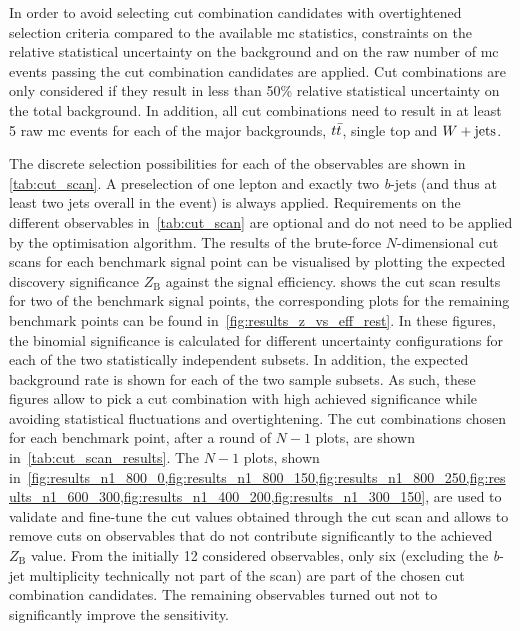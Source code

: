 In order to avoid selecting cut combination candidates with overtightened selection criteria compared to the available \gls{mc} statistics, constraints on the relative statistical uncertainty on the background and on the raw number of \gls{mc} events passing the cut combination candidates are applied. Cut combinations are only considered if they result in less than 50\% relative statistical uncertainty on the total background. In addition, all cut combinations need to result in at least 5 raw \gls{mc} events for each of the major backgrounds, $t\bar{t}$, single top and $W+\mathrm{jets}$.

The discrete selection possibilities for each of the observables are shown in \cref{tab:cut_scan}. A preselection of one lepton and exactly two \textit{b}-jets (and thus at least two jets overall in the event) is always applied. Requirements on the different observables in~\cref{tab:cut_scan} are optional and do not need to be applied by the optimisation algorithm. The results of the brute-force $N$-dimensional cut scans for each benchmark signal point can be visualised by plotting the expected discovery significance $Z_\mathrm{B}$ against the signal efficiency.  shows the cut scan results for two of the benchmark signal points, the corresponding plots for the remaining benchmark points can be found in~\cref{fig:results_z_vs_eff_rest}. In these figures, the binomial significance is calculated for different uncertainty configurations for each of the two statistically independent subsets. In addition, the expected background rate is shown for each of the two sample subsets. As such, these figures allow to pick a cut combination with high achieved significance while avoiding statistical fluctuations and overtightening. The cut combinations chosen for each benchmark point, after a round of $N-1$ plots, are shown in~\cref{tab:cut_scan_results}. The $N-1$ plots, shown in~\cref{fig:results_n1_800_0,fig:results_n1_800_150,fig:results_n1_800_250,fig:results_n1_600_300,fig:results_n1_400_200,fig:results_n1_300_150}, are used to validate and fine-tune the cut values obtained through the cut scan and allows to remove cuts on observables that do not contribute significantly to the achieved $Z_\mathrm{B}$ value. From the initially 12 considered observables, only six (excluding the \textit{b}-jet multiplicity technically not part of the scan) are part of the chosen cut combination candidates. The remaining observables turned out not to significantly improve the sensitivity.



